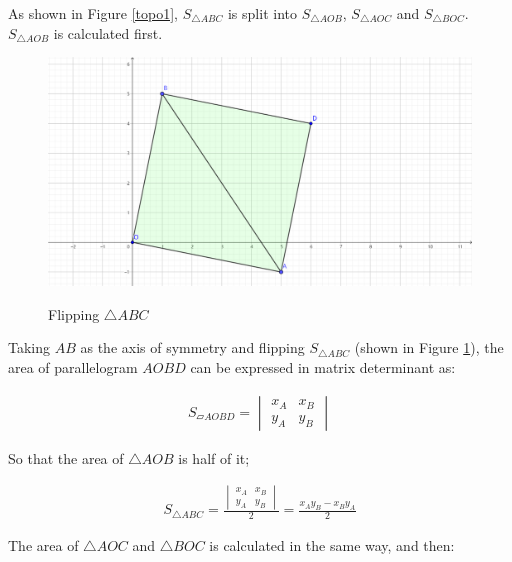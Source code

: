 As shown in Figure \ref{topo1}, $S_{\triangle ABC}$ is split into $S_{\triangle AOB}$, $S_{\triangle AOC}$ and $S_{\triangle BOC}$.   $S_{\triangle AOB}$ is calculated first.

\begin{figure}[H]
\caption{Flipping $\triangle ABC$}
\centering
\includegraphics[scale=0.5]{pic3.png}
\label{topo2}
\end{figure}

Taking $AB$ as the axis of symmetry and flipping $S_{\triangle ABC}$ (shown in Figure \ref{topo2}), the area of parallelogram $AOBD$ can be expressed in matrix determinant as:

\begin{equation}
\begin{split}
S_{\parallelogram AOBD}=\begin{vmatrix}
  x_{A} &x_{B}  \\
  y_{A} &y_{B} 
\end{vmatrix}
\end{split}
\end{equation}

So that the area of $\triangle AOB$ is half of it;

\begin{equation}
\begin{split}
S_{\triangle ABC} =\frac{\begin{vmatrix}
  x_{A} &x_{B}  \\
  y_{A} &y_{B} 
\end{vmatrix}}{2}=\frac{x_{A}y_{B}-x_{B}y_{A}}{2}   
\end{split}
\end{equation}

The area of $\triangle AOC$ and $\triangle BOC$ is calculated in the same way, and then:

